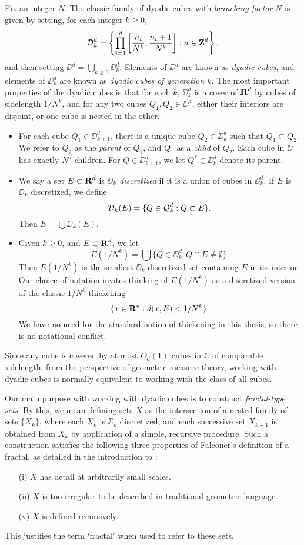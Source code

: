 Fix an integer $N$. The classic family of dyadic cubes with \emph{branching factor} $N$ is given by setting, for each integer $k \geq 0$,
%
\[ \operatorname{\mathcal{D}}_k^d = \left\{ \prod_{i = 1}^d \left[ \frac{n_i}{N^k}, \frac{n_i + 1}{N^k} \right] : n \in \operatorname{\mathbf{Z}}^d \right\}, \]
%
and then setting $\DD^d = \bigcup_{k \geq 0} \DD_k^d$. Elements of $\DD^d$ are known as \emph{dyadic cubes}, and elements of $\DD_k^d$ are known as \emph{dyadic cubes of generation $k$}. The most important properties of the dyadic cubes is that for each $k$, $\DD_k^d$ is a cover of $\operatorname{\mathbf{R}}^d$ by cubes of sidelength $1/N^k$, and for any two cubes $Q_1,Q_2 \in \DD^d$, either their interiors are disjoint, or one cube is nested in the other.
%
\begin{itemize}
	\item For each cube $Q_1 \in \DD_{k+1}^d$, there is a unique cube $Q_2 \in \DD_k^d$ such that $Q_1 \subset Q_2$. We refer to $Q_2$ as the \emph{parent} of $Q_1$, and $Q_1$ as a \emph{child} of $Q_2$. Each cube in $\DD$ has exactly $N^d$ children. For $Q \in \DD_{k+1}^d$, we let $Q^* \in \DD_k^d$ denote its parent.

	\item We say a set $E \subset \operatorname{\mathbf{R}}^d$ is \emph{$\DD_k$ discretized} if it is a union of cubes in $\DD_k^d$. If $E$ is $\DD_k$ discretized, we define
	\[ \operatorname{\mathcal{D}}_k(E) = \{ Q \in \operatorname{\mathcal{Q}}_k^d : Q \subset E \}. \]
	Then $E = \bigcup \DD_k(E)$.

	\item Given $k \geq 0$, and $E \subset \operatorname{\mathbf{R}}^d$, we let
	\[ E(1/N^k) = \bigcup \{ Q \in \DD_k^d : Q \cap E \neq \emptyset \}. \]
	Then $E(1/N^k)$ is the smallest $\DD_k$ discretized set containing $E$ in its interior. Our choice of notation invites thinking of $E(1/N^k)$ as a discretized version of the classic $1/N^k$ thickening
	\[ \{ x \in \operatorname{\mathbf{R}}^d : d(x,E) < 1/N^k \}. \]
	We have no need for the standard notion of thickening in this thesis, so there is no notational conflict.
\end{itemize}
%
Since any cube is covered by at most $O_d(1)$ cubes in $\DD$ of comparable sidelength, from the perspective of geometric measure theory, working with dyadic cubes is normally equivalent to working with the class of all cubes.

Our main purpose with working with dyadic cubes is to construct \emph{fractal-type sets}. By this, we mean defining sets $X$ as the intersection of a nested family of sets $\{ X_k \}$, where each $X_k$ is $\DD_k$ discretized, and each successive set $X_{k+1}$ is obtained from $X_k$ by application of a simple, recursive procedure. Such a construction satisfies the following three properties of Falconer's definition of a fractal, as detailed in the introduction to \cite{Falconer}:
%
\begin{itemize}
	\item[(i)] $X$ has detail at arbitrarily small scales.
	\item[(ii)] $X$ is too irregular to be described in traditional geometric language.
	\item[(v)] $X$ is defined recursively.
\end{itemize}
%
This justifies the term `fractal' when used to refer to these sets.


